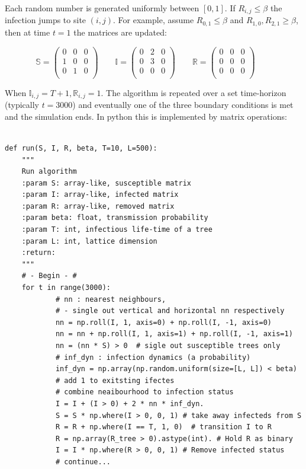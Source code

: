 Each random number is generated uniformly between $[0,1] $. If  $R_{i,j} \leqslant \beta$ the infection jumps to site $(i,j)$. For example, assume $R_{0,1}\leqslant \beta$ and $R_{1,0}, R_{2,1} \geq \beta $, then at time $t=1$ the matrices are updated:

\begin{equation}
    \mathbb{S} = \left( \begin{array}{ccc}
    0 & 0 & 0\\
    1 & 0 & 0\\
    0& 1 & 0 \\
    \end{array} \right)\qquad
    \mathbb{I}= \left( \begin{array}{ccc}
    0 & 2 & 0\\
    0 & 3 & 0\\
    0& 0 & 0 \\
    \end{array} \right)\qquad
    \mathbb{R}= \left( \begin{array}{ccc}
    0 & 0 & 0\\
    0 & 0 & 0\\
    0 & 0 & 0\\
    \end{array} \right)\qquad
\end{equation}
    
When $\mathbb{I}_{i,j}=T+1, \mathbb{R}_{i,j} = 1$. The algorithm is repeated over a set time-horizon (typically $t=3000$) and eventually one of the three boundary conditions is met and the simulation ends. In python this is implemented by matrix operations:

\begin{lstlisting}[style=pythoncode,
    caption = An alorithm written in python to compute matrix equations and simulate disease spread. Code can be found in: \textcolor{red}{cite github repo?}.,
    label = py:rand]

def run(S, I, R, beta, T=10, L=500):
    """
    Run algorithm
    :param S: array-like, susceptible matrix
    :param I: array-like, infected matrix
    :param R: array-like, removed matrix
    :param beta: float, transmission probability
    :param T: int, infectious life-time of a tree
    :param L: int, lattice dimension
    :return:
    """
    # - Begin - #
    for t in range(3000):
            # nn : nearest neighbours, 
            # - single out vertical and horizontal nn respectively
            nn = np.roll(I, 1, axis=0) + np.roll(I, -1, axis=0)
            nn = nn + np.roll(I, 1, axis=1) + np.roll(I, -1, axis=1)
            nn = (nn * S) > 0  # sigle out susceptible trees only
            # inf_dyn : infection dynamics (a probability)
            inf_dyn = np.array(np.random.uniform(size=[L, L]) < beta)
            # add 1 to exitsting ifectes 
            # combine neaibourhood to infection status
            I = I + (I > 0) + 2 * nn * inf_dyn. 
            S = S * np.where(I > 0, 0, 1) # take away infecteds from S
            R = R + np.where(I == T, 1, 0)  # transition I to R
            R = np.array(R_tree > 0).astype(int). # Hold R as binary
            I = I * np.where(R > 0, 0, 1) # Remove infected status 
            # continue...
\end{lstlisting}

